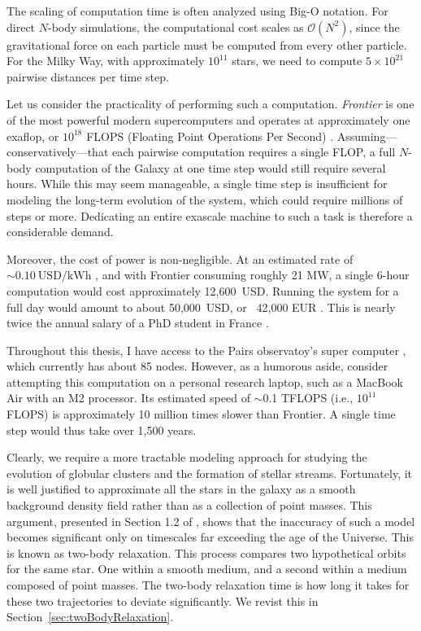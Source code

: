     The scaling of computation time is often analyzed using Big-O notation. For direct $N$-body simulations, the computational cost scales as $\mathcal{O}(N^2)$, since the gravitational force on each particle must be computed from every other particle. For the Milky Way, with approximately $10^{11}$ stars, we need to compute $5 \times 10^{21}$ pairwise distances per time step.

    Let us consider the practicality of performing such a computation. \textit{Frontier} is one of the most powerful modern supercomputers and operates at approximately one exaflop, or $10^{18}$ FLOPS (Floating Point Operations Per Second) \citep{atchley2023frontier}. Assuming—conservatively—that each pairwise computation requires a single FLOP, a full $N$-body computation of the Galaxy at one time step would still require several hours. While this may seem manageable, a single time step is insufficient for modeling the long-term evolution of the system, which could require millions of steps or more. Dedicating an entire exascale machine to such a task is therefore a considerable demand.

    Moreover, the cost of power is non-negligible. At an estimated rate of $\sim 0.10~\mathrm{USD}/\mathrm{kWh}$ \citep{table20245}, and with Frontier consuming roughly 21 MW, a single 6-hour computation would cost approximately 12,600~USD. Running the system for a full day would amount to about 50,000~USD, or ~42,000 EUR \citep{ECB_USD_EUR_2025}. This is nearly twice the annual salary of a PhD student in France \citep{MESR_financement_doctoral}.

    Throughout this thesis, I have access to the Pairs observatoy's super computer \citep[tycho]{DIO_OBSPM}, which currently has about 85 nodes. However, as a humorous aside, consider attempting this computation on a personal research laptop, such as a MacBook Air with an M2 processor. Its estimated speed of $\sim$0.1 TFLOPS (i.e., $10^{11}$ FLOPS) \citep{hubner2025apple} is approximately 10 million times slower than Frontier. A single time step would thus take over 1,500 years.

    Clearly, we require a more tractable modeling approach for studying the evolution of globular clusters and the formation of stellar streams. Fortunately, it is well justified to approximate all the stars in the galaxy as a smooth background density field rather than as a collection of point masses. This argument, presented in Section 1.2 of \citet{2008gady.book.....B}, shows that the inaccuracy of such a model becomes significant only on timescales far exceeding the age of the Universe. This is known as two-body relaxation. This process compares two hypothetical orbits for the same star. One within a smooth medium, and a second within a medium composed of point masses. The two-body relaxation time is how long it takes for these two trajectories to deviate significantly. We revist this in Section~\ref{sec:twoBodyRelaxation}.
        
